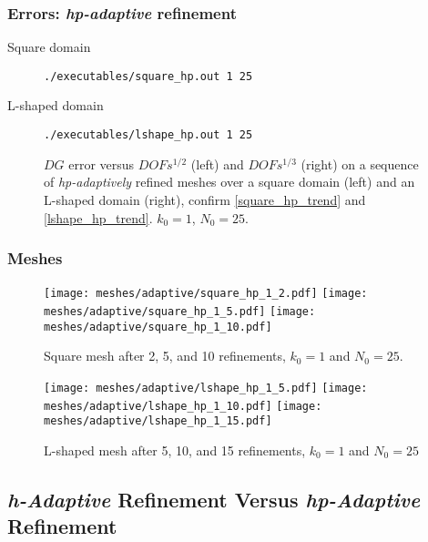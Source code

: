 \begin{frame}[fragile]
    \frametitle{Errors: \textit{hp-adaptive} refinement}

    \begin{description}
        \item[Square domain] \lstinline{./executables/square_hp.out 1 25}
        \item[L-shaped domain] \lstinline{./executables/lshape_hp.out 1 25}
    \end{description}

    \begin{figure}[!ht]
        
        \caption{$DG$ error versus $DOFs^{1/2}$ (left) and $DOFs^{1/3}$ (right) on a sequence of \textit{hp-adaptively} refined meshes over a square domain (left) and an L-shaped domain (right), confirm \eqref{square_hp_trend} and \eqref{lshape_hp_trend}. $k_0 = 1$, $N_0 = 25$.}
    \end{figure}
\end{frame}

\begin{frame}
    \frametitle{Meshes}

    \begin{figure}[!ht]
        \centering
        \texttt{[image: meshes/adaptive/square\_hp\_1\_2.pdf]}
        \texttt{[image: meshes/adaptive/square\_hp\_1\_5.pdf]}
        \texttt{[image: meshes/adaptive/square\_hp\_1\_10.pdf]}
        \caption{Square mesh after 2, 5, and 10 refinements, $k_0 = 1$ and $N_0 = 25$.}
    \end{figure}
    
    \begin{figure}[!ht]
        \centering
        \texttt{[image: meshes/adaptive/lshape\_hp\_1\_5.pdf]}
        \texttt{[image: meshes/adaptive/lshape\_hp\_1\_10.pdf]}
        \texttt{[image: meshes/adaptive/lshape\_hp\_1\_15.pdf]}
        \caption{L-shaped mesh after 5, 10, and 15 refinements, $k_0 = 1$ and $N_0 = 25$}
    \end{figure}
\end{frame}

\subsection{\textit{h-Adaptive} Refinement Versus \textit{hp-Adaptive} Refinement}

